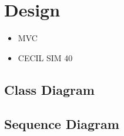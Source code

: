 
\chapter{Design} \label{Chapter:Design}
\begin{itemize}
\item MVC
\item CECIL SIM 40
\end{itemize}
\section{Class Diagram}
\section{Sequence Diagram}